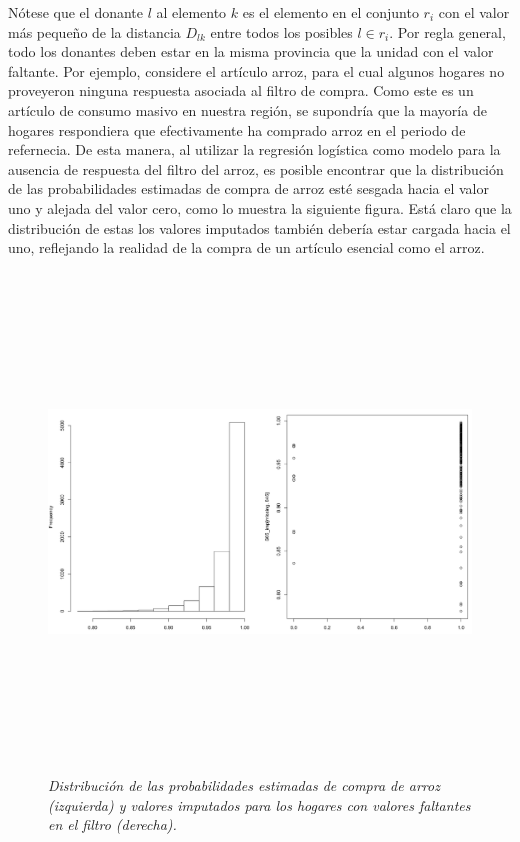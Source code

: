 Nótese que el donante \(l\) al elemento \(k\) es el elemento en el conjunto \(r_i\) con el valor más pequeño de la distancia \(D_{lk}\) entre todos los posibles \(l \in r_i\). Por regla general, todo los donantes deben estar en la misma provincia que la unidad con el valor faltante. Por ejemplo, considere el artículo arroz, para el cual algunos hogares no proveyeron ninguna respuesta asociada al filtro de compra. Como este es un artículo de consumo masivo en nuestra región, se supondría que la mayoría de hogares respondiera que efectivamente ha comprado arroz en el periodo de refernecia. De esta manera, al utilizar la regresión logística como modelo para la ausencia de respuesta del filtro del arroz, es posible encontrar que la distribución de las probabilidades estimadas de compra de arroz esté sesgada hacia el valor uno y alejada del valor cero, como lo muestra la siguiente figura. Está claro que la distribución de estas los valores imputados también debería estar cargada hacia el uno, reflejando la realidad de la compra de un artículo esencial como el arroz.

\begin{figure}
\centering
\includegraphics[width=\textwidth,height=5.20833in]{Pics/11.png}
\caption{\emph{Distribución de las probabilidades estimadas de compra de arroz (izquierda) y valores imputados para los hogares con valores faltantes en el filtro (derecha).}}
\end{figure}

